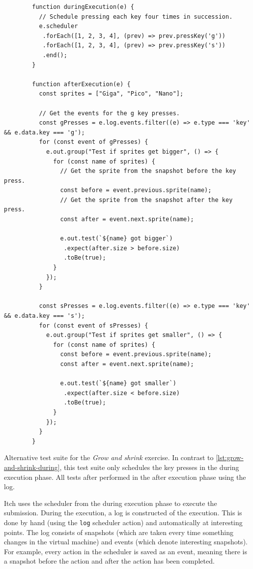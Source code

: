\documentclass[../main]{subfiles}
\begin{document}
\begin{listing}
    \begin{verbatim}
        function duringExecution(e) {
          // Schedule pressing each key four times in succession.
          e.scheduler
           .forEach([1, 2, 3, 4], (prev) => prev.pressKey('g'))
           .forEach([1, 2, 3, 4], (prev) => prev.pressKey('s'))
           .end();
        }

        function afterExecution(e) {
          const sprites = ["Giga", "Pico", "Nano"];

          // Get the events for the g key presses.
          const gPresses = e.log.events.filter((e) => e.type === 'key' && e.data.key === 'g');
          for (const event of gPresses) {
            e.out.group("Test if sprites get bigger", () => {
              for (const name of sprites) {
                // Get the sprite from the snapshot before the key press.
                const before = event.previous.sprite(name);
                // Get the sprite from the snapshot after the key press.
                const after = event.next.sprite(name);

                e.out.test(`${name} got bigger`)
                 .expect(after.size > before.size)
                 .toBe(true);
              }
            });
          }

          const sPresses = e.log.events.filter((e) => e.type === 'key' && e.data.key === 's');
          for (const event of sPresses) {
            e.out.group("Test if sprites get smaller", () => {
              for (const name of sprites) {
                const before = event.previous.sprite(name);
                const after = event.next.sprite(name);

                e.out.test(`${name} got smaller`)
                 .expect(after.size < before.size)
                 .toBe(true);
              }
            });
          }
        }
    \end{verbatim}
    \caption{
        Alternative test suite for the \emph{Grow and shrink} exercise.
        In contrast to \cref{lst:grow-and-shrink-during}, this test suite only schedules the key presses in the during execution phase.
        All tests after performed in the after execution phase using the log.
    }
    \label{lst:grow-and-shrink-after}
\end{listing}

Itch uses the scheduler from the during execution phase to execute the submission.
During the execution, a log is constructed of the execution.
This is done by hand (using the \texttt{log} scheduler action) and automatically at interesting points.
The log consists of snapshots (which are taken every time something changes in the virtual machine) and events (which denote interesting snapshots).
For example, every action in the scheduler is saved as an event, meaning there is a snapshot before the action and after the action has been completed.
\end{document}
